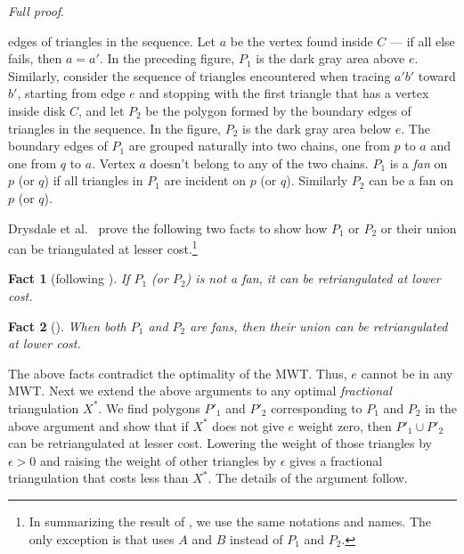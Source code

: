 \documentclass[final]{siamltex}
\newcommand{\edge}{e}
\newcommand{\fracTriang}{X}
\newtheorem{fact}{Fact}[theorem]
\newenvironment{fullproof}{\par{\it Full proof}. \ignorespaces}{\endproof}
\begin{document}
\begin{fullproof}
\begin{window}
edges of triangles in the sequence.
Let $a$ be the vertex found inside $C$ --- if all else fails, then $a= a'$.
In the preceding figure, $P_1$ is the dark gray area above $\edge$.  
Similarly, consider the sequence of triangles 
encountered when tracing $a' b'$ toward $b'$, starting from edge $\edge$ and stopping with the 
first triangle that has a vertex inside disk $C$, and let $P_2$ be the polygon formed by the boundary
edges of triangles in the sequence. In the figure, $P_2$ is the dark gray area below $\edge$.
The boundary edges of $P_1$ are grouped naturally into two chains, one from $p$ to $a$ and 
one from $q$ to $a$. Vertex $a$ doesn't belong to any of the two chains. 
$P_1$ is a {\em fan} on $p$ (or $q$) if all triangles in $P_1$ are incident on $p$ (or $q$). 
Similarly $P_2$ can be a fan on $p$ (or $q$).
\end{window}


Drysdale et al.~\cite{drysdale2001exclusion} prove the following two facts to show how $P_1$ or $P_2$ or 
their union can be triangulated at lesser cost.\footnote
{In summarizing the result of \cite{drysdale2001exclusion}, we use the same notations and names. 
The only exception is that \cite{drysdale2001exclusion} uses $A$ and $B$ instead of $P_1$ and $P_2$.}   
\begin{fact}[following {\cite[Lemma 8]{drysdale2001exclusion}}]\label{prop:diamond8}
If $P_1$ (or $P_2$) is not a fan, it can be retriangulated at lower cost. 
\end{fact}

\begin{fact}[{\cite[Lemma 9]{drysdale2001exclusion}}]\label{prop:diamond9}
When both $P_1$ and $P_2$ are fans, then their union can be retriangulated at lower cost.
\end{fact}

The above facts contradict the optimality of the MWT. Thus, $\edge$ cannot be in any MWT.
Next we extend the above arguments to any optimal {\em fractional} triangulation $\fracTriang^*$.
We find polygons $P'_1$ and $P'_2$ corresponding to $P_1$ and $P_2$ in the above argument and show that if $\fracTriang^*$ does not give 
$\edge$ weight zero, then $P'_1\cup P'_2$ can be retriangulated at lesser cost. Lowering the weight of those
triangles by $\epsilon> 0$ and raising the weight of other triangles by $\epsilon$ gives a fractional triangulation
that costs less than $\fracTriang^*$. The details of the argument follow.
 

\end{fullproof}
\end{document}
